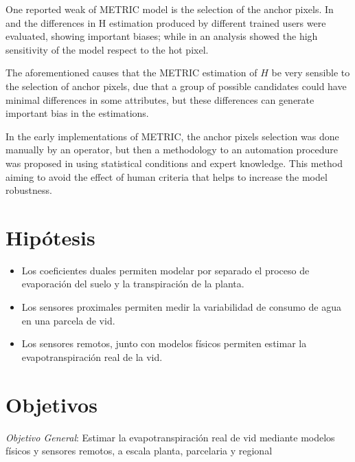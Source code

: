 \documentclass[]{article}
\begin{document}
One reported weak of METRIC model is the selection of the anchor pixels. In \citep{long2013assessing} and \citep{mortonassessing} the differences in H estimation produced by different trained users were evaluated, showing important biases; while in \citep{choragudi2011sensitivity, wang2009sensitivity} an analysis showed the high sensitivity of the model respect to the hot pixel.

The aforementioned causes that the METRIC estimation of $H$ be very sensible to the selection of anchor pixels, due that a group of possible candidates could have minimal differences in some attributes, but these differences can generate important bias in the estimations.

In the early implementations of METRIC, the anchor pixels selection was done manually by an operator, but then a methodology to an automation procedure  was proposed in \citep{allenautomated2013} using statistical conditions and expert knowledge. This method  aiming to avoid the effect of human criteria that helps to increase the model robustness.


\section{Hipótesis}
\begin{itemize}
\item Los coeficientes duales permiten modelar por separado el proceso de evaporación del suelo y la transpiración de la planta.
\item Los sensores proximales permiten medir la variabilidad de consumo de agua en una parcela de vid.
\item Los sensores remotos, junto con modelos físicos permiten estimar la evapotranspiración real de la vid.


\end{itemize}

\section{Objetivos}

\textit{Objetivo General}: Estimar la evapotranspiración real de vid mediante modelos físicos y sensores remotos, a escala planta, parcelaria y regional \\
\end{document}
